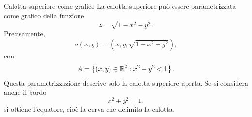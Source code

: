 \documentclass[a4paper]{article}
\begin{document}
\begin{snippetexample}{Calotta superiore come grafico}
    La calotta superiore può essere parametrizzata come grafico della funzione
    \[
        z=\sqrt{1-x^2-y^2}.
    \]
    Precisamente,
    \[
        \sigma(x,y)=
        \left(
            x,y,\sqrt{1-x^2-y^2}
        \right),
    \]
    con
    \[
        A=
        \left\{
            (x,y)\in\mathbb{R}^2:
            x^2+y^2<1
        \right\}.
    \]
    Questa parametrizzazione descrive solo la calotta superiore aperta. Se si considera anche il bordo
    \[
        x^2+y^2=1,
    \]
    si ottiene l'equatore, cioè la curva che delimita la calotta.

    \begin{center}
    \end{center}
\end{snippetexample}
\end{document}
